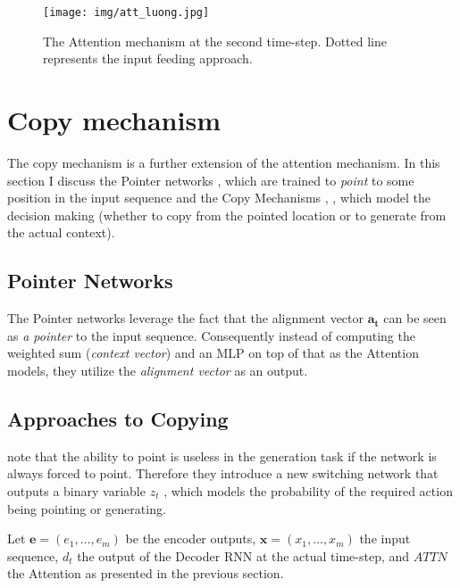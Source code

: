 \begin{figure}[!h]
    \centering
    \texttt{[image: img/att\_luong.jpg]}
    \caption{\centering The Attention mechanism at the second time-step. Dotted line represents the input feeding approach.} \label{input_feeding_attention}
\end{figure}


\section{Copy mechanism} \label{copy_mech_sec}
The copy mechanism is a further extension of the attention mechanism. In this section I discuss the Pointer networks \citep{vinyals2015pointer}, which are trained to \emph{point} to some position in the input sequence and the Copy Mechanisms \citep{gulcehre2016pointing}, \citep{gu2016incorporating}, \citep{yang2016referenceaware} which model the decision making (whether to copy from the pointed location or to generate from the actual context).

\subsection{Pointer Networks}

The Pointer networks \citep{vinyals2015pointer} leverage the fact that the alignment vector $\boldsymbol{a_t}$  can be seen as \emph{a pointer} to the input sequence. Consequently instead of computing the weighted sum (\emph{context vector}) and an MLP on top of that as the Attention models, they utilize the \emph{alignment vector} as an output.

\subsection{Approaches to Copying}

\citep{gulcehre2016pointing} note that the ability to point is useless in the generation task if the network is always forced to point. Therefore they introduce a new switching network that outputs a binary variable $z_t$ , which models the probability of the required action being pointing or generating.

Let $\boldsymbol{e} = (e_1, \dots, e_m)$ be the encoder outputs, $\boldsymbol{x} = (x_1, \dots, x_m)$ the input sequence, $d_t$ the output of the Decoder RNN at the actual time-step, and $ATTN$ the Attention as presented in the previous section.

